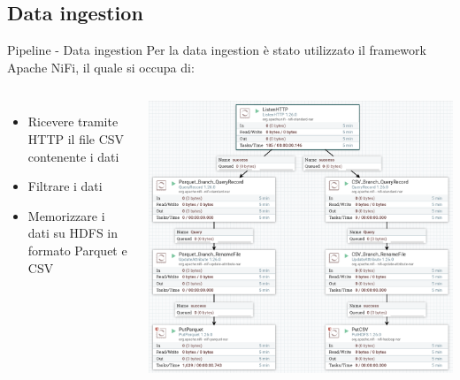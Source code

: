 \documentclass[13pt,aspectratio=169,t,xcolor=table]{beamer}
\begin{document}
\subsection{Data ingestion}
\begin{frame}{Pipeline - Data ingestion}
    Per la data ingestion è stato utilizzato il framework Apache NiFi, il quale si occupa di:
    \begin{columns}
            \begin{minipage}[b]{1\textwidth}
                \begin{itemize}
                    \item Ricevere tramite HTTP il file CSV contenente i dati
                    \item Filtrare i dati
                    \item Memorizzare i dati su HDFS in formato Parquet e CSV
                \end{itemize}
            \end{minipage}
            \begin{minipage}{1\textwidth}
                \begin{adjustbox}{margin=0cm 0cm 1.7cm 0cm, center} %
                    \includegraphics[width=1\textwidth]{res/nifi_flow.png}
                \end{adjustbox}
            \end{minipage}
    \end{columns}
\end{frame}
\end{document}
